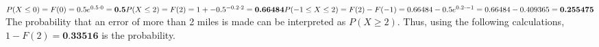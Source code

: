 \documentclass[12pt, letterpaper]{article}
\begin{document}
\subsection{}
\(
P(X \le 0) = F(0) = 0.5e^{0.5 \cdot 0} \\
= \textbf{0.5} \\
P(X \le 2) = F(2) = 1 + -0.5^{-0.2 \cdot 2} \\
= \textbf{0.66484} \\
P(-1 \le X \le 2) = F(2) - F(-1) = 0.66484 - 0.5e^{0.2 \cdot -1} \\
= 0.66484 - 0.409365 \\
= \textbf{0.255475} \\
\)
The probability that an error of more than 2 miles is made can be interpreted as $P(X \ge 2)$.
Thus, using the following calculations, $1 - F(2) = \textbf{0.33516}$ is the probability.
\end{document}
